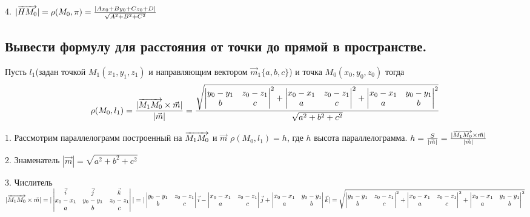 4. $|\overrightarrow{HM_0}| = \rho (M_0, \pi) = \frac{ |Ax_0 + By_0 + Cz_0 + D| }{\sqrt{A^2+B^2+C^2}}$

\subsection{Вывести формулу для расстояния от точки до прямой в пространстве.}

Пусть $l_1$(задан точкой $M_1(x_1, y_1, z_1)$ и направляющим вектором $\vec{m}_1\{a,b,c\}$) и точка 
$M_0(x_0,y_0,z_0)$ тогда 
$$\rho(M_0, l_1) = \frac{ |\overrightarrow{M_1M_0}\times\vec{m}| }{ |\vec{m}| } = 
\frac{\sqrt{\begin{vmatrix}y_0-y_1&z_0-z_1\\b&c\end{vmatrix}^2+
\begin{vmatrix}x_0-x_1&z_0-z_1\\a&c\end{vmatrix}^2+
\begin{vmatrix}x_0-x_1&y_0-y_1\\a&b\end{vmatrix}^2}}{\sqrt{a^2+b^2+c^2}}$$

1. Рассмотрим параллелограмм построенный на  $\overrightarrow{M_1M_0}$ и $\vec{m}$
$\rho(M_0, l_1) = h$, где $h$ высота параллелограмма.
$h = \frac{S}{ |\vec{m}| } = \frac{ |\overrightarrow{M_1M_0} \times \vec{m}| }{ |\vec{m}| }$

2. Знаменатель $|\vec{m}| = \sqrt{a^2+b^2+c^2}$

3. Числитель $|\overrightarrow{M_1M_0} \times \vec{m}| = |\begin{vmatrix}\vec{i}&\vec{j}&\vec{k}\\x_0-x_1&y_0-y_1&z_0-z_1\\a&b&c\end{vmatrix}| = 
|\begin{vmatrix}y_0-y_1&z_0-z_1\\b&c\end{vmatrix}\vec{i}-
\begin{vmatrix}x_0-x_1&z_0-z_1\\a&c\end{vmatrix}\vec{j}+
\begin{vmatrix}x_0-x_1&y_0-y_1\\a&b\end{vmatrix}\vec{k}|=
\sqrt{\begin{vmatrix}y_0-y_1&z_0-z_1\\b&c\end{vmatrix}^2+
\begin{vmatrix}x_0-x_1&z_0-z_1\\a&c\end{vmatrix}^2+
\begin{vmatrix}x_0-x_1&y_0-y_1\\a&b\end{vmatrix}^2}$

